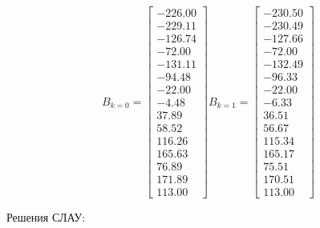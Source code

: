 \documentclass[a4paper, 12pt]{article}
\begin{document}
\[
B_{k = 0} = \left[{\begin{array}{r}
	-226.00 \\
	-229.11 \\
	-126.74 \\
	-72.00 \\
	-131.11 \\
	-94.48 \\
	-22.00 \\
	-4.48 \\
	37.89 \\
	58.52 \\
	116.26 \\
	165.63 \\
	76.89 \\
	171.89 \\
	113.00
	\end{array}}\right]
B_{k = 1} = \left[{
	\begin{array}{r}
	-230.50 \\
	-230.49 \\
	-127.66 \\
	-72.00 \\
	-132.49 \\
	-96.33 \\
	-22.00 \\
	-6.33 \\
	36.51 \\
	56.67 \\
	115.34 \\
	165.17 \\
	75.51 \\ 
	170.51 \\
	113.00
	\end{array}}\right]
\]

\normalsize Решения СЛАУ:
\scriptsize
\end{document}

